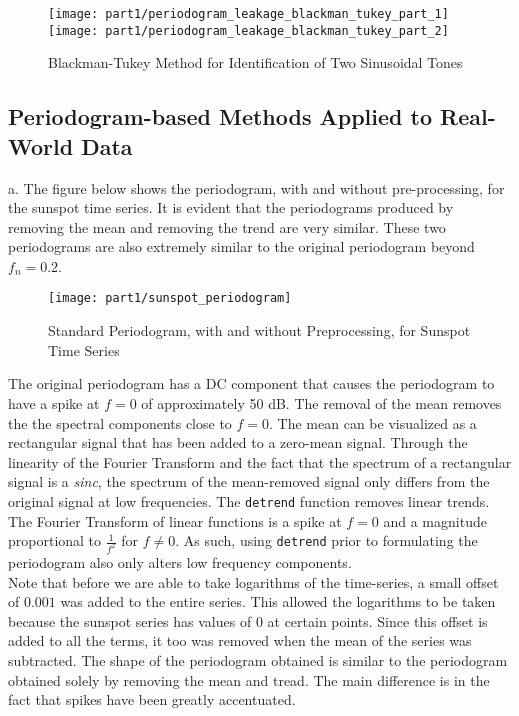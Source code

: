 \begin{figure}[H]
\centering{}
\texttt{[image: part1/periodogram\_leakage\_blackman\_tukey\_part\_1]}
\texttt{[image: part1/periodogram\_leakage\_blackman\_tukey\_part\_2]}
\caption{Blackman-Tukey Method for Identification of Two Sinusoidal Tones}
\end{figure}

\subsection{Periodogram-based Methods Applied to Real-World Data}

\noindent{}a. The figure below shows the periodogram, with and without pre-processing, for the sunspot time series. It is evident that the periodograms produced by removing the mean and removing the trend are very similar. These two periodograms are also extremely similar to the original periodogram beyond $f_n=0.2$.

\begin{figure}[H]
\centering{}
\texttt{[image: part1/sunspot\_periodogram]}
\caption{Standard Periodogram, with and without Preprocessing, for Sunspot Time Series}
\end{figure}

\noindent{}The original periodogram has a DC component that causes the periodogram to have a spike at $f=0$ of approximately 50 dB. The removal of the mean removes the the spectral components close to $f=0$. The mean can be visualized as a rectangular signal that has been added to a zero-mean signal. Through the linearity of the Fourier Transform and the fact that the spectrum of a rectangular signal is a \textit{sinc}, the spectrum of the mean-removed signal only differs from the original signal at low frequencies. The \texttt{detrend} function removes linear trends. The Fourier Transform of linear functions is a spike at $f=0$ and a magnitude proportional to $\frac{1}{f^2}$ for $f \neq 0$. As such, using \texttt{detrend} prior to formulating the periodogram also only alters low frequency components. \\

\noindent{}Note that before we are able to take logarithms of the time-series, a small offset of $0.001$ was added to the entire series. This allowed the logarithms to be taken because the sunspot series has values of $0$ at certain points. Since this offset is added to all the terms, it too was removed when the mean of the series was subtracted. The shape of the periodogram obtained is similar to the periodogram obtained solely by removing the mean and tread. The main difference is in the fact that spikes have been greatly accentuated. \\

